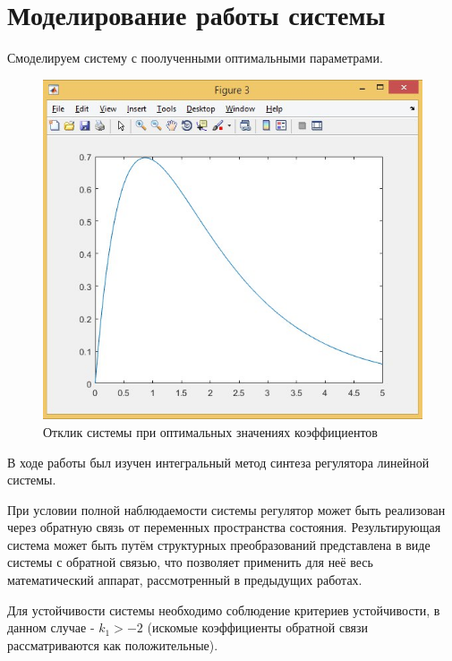\documentclass[14pt,a4paper,report]{report}
\makeatletter
\renewcommand\chapter{
	\thispagestyle{plain}%
	\@afterindentfalse \secdef\@chapter\@schapter}
\makeatother
\begin{document}
\section{Моделирование работы системы}

Смоделируем систему с поолученными оптимальными параметрами.

\begin{figure}[h!]
	\centering
	\includegraphics[scale = 0.73]{images/mod.png}
	\caption{Отклик системы при оптимальных значениях коэффициентов}
	\label{image:5}
\end{figure}
\FloatBarrier

\chapter{Вывод}

В ходе работы был изучен интегральный метод синтеза регулятора линейной системы.

При условии полной наблюдаемости системы регулятор может быть реализован через обратную связь от переменных пространства состояния. Результирующая система может быть путём структурных преобразований представлена в виде системы с обратной связью, что позволяет применить для неё весь математический аппарат, рассмотренный в предыдущих работах.

Для устойчивости системы необходимо соблюдение критериев устойчивости, в данном случае - $k_1>-2$ (искомые коэффициенты обратной связи рассматриваются как положительные).
\end{document}
